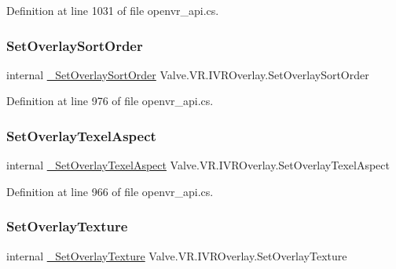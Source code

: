 Definition at line 1031 of file openvr\+\_\+api.\+cs.

\mbox{\label{struct_valve_1_1_v_r_1_1_i_v_r_overlay_a491605e83ff3994299668c79867fe3c2}} 
\subsubsection{\texorpdfstring{SetOverlaySortOrder}{SetOverlaySortOrder}}
{\footnotesize\ttfamily internal \mbox{\hyperlink{struct_valve_1_1_v_r_1_1_i_v_r_overlay_a49aeba8cdd673c4e9b5e5e3cc1e566d6}{\+\_\+\+Set\+Overlay\+Sort\+Order}} Valve.\+V\+R.\+I\+V\+R\+Overlay.\+Set\+Overlay\+Sort\+Order}



Definition at line 976 of file openvr\+\_\+api.\+cs.

\mbox{\label{struct_valve_1_1_v_r_1_1_i_v_r_overlay_a4f9bb6e217b727e791775fd282e3df60}} 
\subsubsection{\texorpdfstring{SetOverlayTexelAspect}{SetOverlayTexelAspect}}
{\footnotesize\ttfamily internal \mbox{\hyperlink{struct_valve_1_1_v_r_1_1_i_v_r_overlay_a479ce5b1183e93ec53ddbaa1bd62f264}{\+\_\+\+Set\+Overlay\+Texel\+Aspect}} Valve.\+V\+R.\+I\+V\+R\+Overlay.\+Set\+Overlay\+Texel\+Aspect}



Definition at line 966 of file openvr\+\_\+api.\+cs.

\mbox{\label{struct_valve_1_1_v_r_1_1_i_v_r_overlay_a5263819c136d53b94cc42b72eea38be6}} 
\subsubsection{\texorpdfstring{SetOverlayTexture}{SetOverlayTexture}}
{\footnotesize\ttfamily internal \mbox{\hyperlink{struct_valve_1_1_v_r_1_1_i_v_r_overlay_a213cd2c6bbe053b4e8359ca63a2d4089}{\+\_\+\+Set\+Overlay\+Texture}} Valve.\+V\+R.\+I\+V\+R\+Overlay.\+Set\+Overlay\+Texture}



